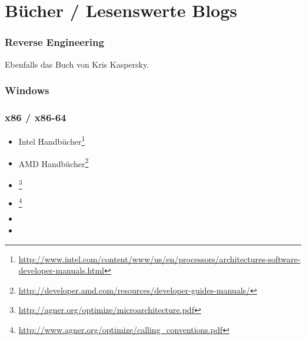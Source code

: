\chapter{Bücher / Lesenswerte Blogs}


\subsection{Reverse Engineering}




Ebenfalls das Buch von Kris Kaspersky.

\subsection{Windows}



\subsection{\CCpp}



\subsection{x86 / x86-64}

\label{x86_manuals}
\begin{itemize}
\item Intel Handbücher\footnote{\AlsoAvailableAs \url{http://www.intel.com/content/www/us/en/processors/architectures-software-developer-manuals.html}}

\item AMD Handbücher\footnote{\AlsoAvailableAs \url{http://developer.amd.com/resources/developer-guides-manuals/}}

\item \AgnerFog{}\footnote{\AlsoAvailableAs \url{http://agner.org/optimize/microarchitecture.pdf}}

\item \AgnerFogCC{}\footnote{\AlsoAvailableAs \url{http://www.agner.org/optimize/calling_conventions.pdf}}

\item \IntelOptimization

\item \AMDOptimization
\end{itemize}

